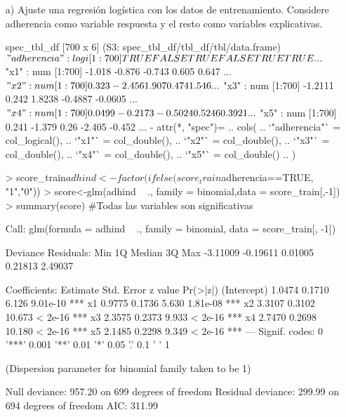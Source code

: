 \documentclass[11pt,onside]{article}
\begin{document}
\begin{itemize}
\item[a)] Ajuste una regresión logística con los datos de entrenamiento. Considere adherencia como variable respuesta y el resto como variables explicativas.


\begin{Schunk}
\begin{Soutput}
spec_tbl_df [700 x 6] (S3: spec_tbl_df/tbl_df/tbl/data.frame)
 $ "adherencia": logi [1:700] TRUE FALSE TRUE FALSE TRUE TRUE ...
 $ "x1"        : num [1:700] -1.018 -0.876 -0.743 0.605 0.647 ...
 $ "x2"        : num [1:700] 0.323 -2.456 1.907 0.474 1.546 ...
 $ "x3"        : num [1:700] -1.2111 0.242 1.8238 -0.4887 -0.0605 ...
 $ "x4"        : num [1:700] 0.0499 -0.2173 -0.5024 0.5246 0.3921 ...
 $ "x5"        : num [1:700] 0.241 -1.379 0.26 -2.405 -0.452 ...
 - attr(*, "spec")=
  .. cols(
  ..   `"adherencia"` = col_logical(),
  ..   `"x1"` = col_double(),
  ..   `"x2"` = col_double(),
  ..   `"x3"` = col_double(),
  ..   `"x4"` = col_double(),
  ..   `"x5"` = col_double()
  .. )
\end{Soutput}
\end{Schunk}

\begin{Schunk}
\begin{Sinput}
> score_train$adhind<-factor(ifelse(score_train$adherencia==TRUE, "1","0"))
> score<-glm(adhind ~ ., family = binomial,data = score_train[,-1])
> summary(score)  #Todas las variables son significativas
\end{Sinput}
\begin{Soutput}
Call:
glm(formula = adhind ~ ., family = binomial, data = score_train[, 
    -1])

Deviance Residuals: 
     Min        1Q    Median        3Q       Max  
-3.11009  -0.19611   0.01005   0.21813   2.49037  

Coefficients:
            Estimate Std. Error z value Pr(>|z|)    
(Intercept)   1.0474     0.1710   6.126 9.01e-10 ***
x1            0.9775     0.1736   5.630 1.81e-08 ***
x2            3.3107     0.3102  10.673  < 2e-16 ***
x3            2.3575     0.2373   9.933  < 2e-16 ***
x4            2.7470     0.2698  10.180  < 2e-16 ***
x5            2.1485     0.2298   9.349  < 2e-16 ***
---
Signif. codes:  0 '***' 0.001 '**' 0.01 '*' 0.05 '.' 0.1 ' ' 1

(Dispersion parameter for binomial family taken to be 1)

    Null deviance: 957.20  on 699  degrees of freedom
Residual deviance: 299.99  on 694  degrees of freedom
AIC: 311.99


\end{Soutput}
\end{Schunk}
\end{itemize}
\end{document}
